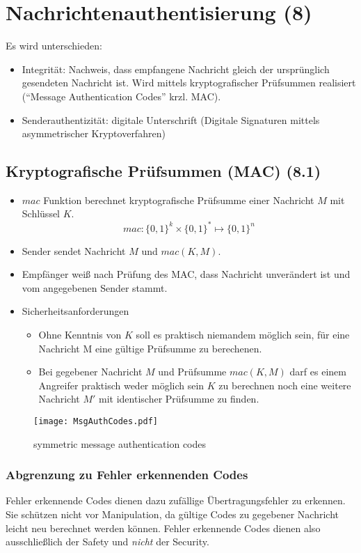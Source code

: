 \chapter{Nachrichtenauthentisierung (8)}
Es wird unterschieden:
\begin{itemize}
  \item Integrität: Nachweis, dass empfangene Nachricht gleich der ursprünglich gesendeten Nachricht ist. Wird mittels kryptografischer Prüfsummen realisiert ("`Message Authentication Codes"' krzl. MAC).
  \item Senderauthentizität: digitale Unterschrift (Digitale Signaturen mittels asymmetrischer Kryptoverfahren)
\end{itemize}

\section{Kryptografische Prüfsummen (MAC) (8.1)}
\begin{itemize}
  \item $mac$ Funktion berechnet kryptografische Prüfsumme einer Nachricht $M$ mit Schlüssel $K$. 
  	$$ mac: \{0,1\}^k \times \{0,1\}^* \mapsto \{0,1\}^n $$
	\item Sender sendet Nachricht $M$ und $mac(K,M)$.
	\item Empfänger weiß nach Prüfung des MAC, dass Nachricht unverändert ist und vom angegebenen Sender stammt.
	\item Sicherheitsanforderungen
	\begin{itemize}
  	\item Ohne Kenntnis von $K$ soll es praktisch niemandem möglich sein, für eine Nachricht M eine gültige Prüfsumme zu berechenen. 
  	\item Bei gegebener Nachricht $M$ und Prüfsumme $mac(K,M)$ darf es einem Angreifer praktisch weder möglich sein $K$ zu berechnen noch eine weitere Nachricht $M'$ mit identischer Prüfsumme zu finden. 
	\end{itemize}
\end{itemize}

\begin{figure}[htp]
	\centering
	\texttt{[image: MsgAuthCodes.pdf]}
	\caption{symmetric message authentication codes}
\end{figure}


\subsection* {Abgrenzung zu Fehler erkennenden Codes}
Fehler erkennende Codes dienen dazu zufällige Übertragungsfehler zu erkennen. Sie schützen nicht vor Manipulation, da gültige Codes zu gegebener Nachricht leicht neu berechnet werden können. Fehler erkennende Codes dienen also ausschließlich der Safety und \emph{nicht} der Security.


